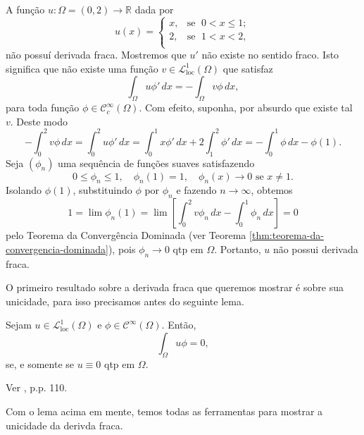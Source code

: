 \documentclass[a4paper, 11pt]{book}
\theoremstyle{definition}
\newcommand{\bR}{\mathbb{R}}
\newcommand{\cC}{\mathcal{C}}
\newcommand{\cL}{\mathcal{L}}
\newcommand{\loc}{\mathrm{loc}}
\begin{document}
\begin{ex}
    A função $u : \Omega  = (0,2) \to \bR$ dada por
    \[
        u(x) = \left\{
            \begin{array}{rl}
                x, & \!\text{se }\; 0 < x \leqslant 1;\\
                2, & \!\text{se }\; 1 < x < 2,\\
            \end{array}
        \right.
    \]
    não possuí derivada fraca.
    Mostremos que $u'$ não existe no sentido fraco.
    Isto significa que não existe uma função $v \in \cL^1_\loc(\Omega)$ que satisfaz
    \[
        \int_\Omega u \phi' \, dx = -\int_\Omega v \phi \,dx,
    \]
    para toda função $\phi \in \cC_c^\infty(\Omega)$. 
    Com efeito, suponha, por absurdo que existe tal $v$. Deste modo
    \[
        -\int_0^2 v \phi \, dx = \int_0^2 u \phi' \,dx = \int_0^1 x \phi' \,dx + 2\int_1^2 \phi' \,dx =- \int_0^1 \phi \,dx - \phi(1).
    \]
    Seja $(\phi_n)$ uma sequência de funções suaves satisfazendo
    \[
        0 \leqslant \phi_n \leqslant 1, \quad \phi_n(1) = 1, \quad \phi_n(x) \to 0 \text{ se } x \neq 1.
    \]
    Isolando $\phi(1)$, substituindo $\phi$ por $\phi_n$ e fazendo $n \to \infty$, obtemos
    \[
        1 = \lim \phi_n(1) = \lim \left[ \int_0^2 v \phi_n \, dx- \int_0^1 \phi_n \,dx \right] = 0
    \]
    pelo Teorema da Convergência Dominada (ver Teorema \ref{thm:teorema-da-convergencia-dominada}), pois $\phi_n \to 0$ qtp em $\Omega$.
    Portanto, $u$ não possui derivada fraca.
\end{ex}

O primeiro resultado sobre a derivada fraca que queremos mostrar é sobre sua unicidade, para isso precisamos antes do seguinte lema.

\begin{lbox}
    Sejam $u \in \cL^1_{\loc}(\Omega)$ e $\phi \in \cC^\infty(\Omega)$.
    Então,
    \[
        \int_\Omega u \phi = 0,
    \]
    se, e somente se $u \equiv 0$ qtp em $\Omega$.
\end{lbox}
\begin{prf}
    Ver \cite{brezis-functional.analysis}, p.p. 110.
\end{prf}

Com o lema acima em mente, temos todas as ferramentas para mostrar a unicidade da derivda fraca.
\end{document}
